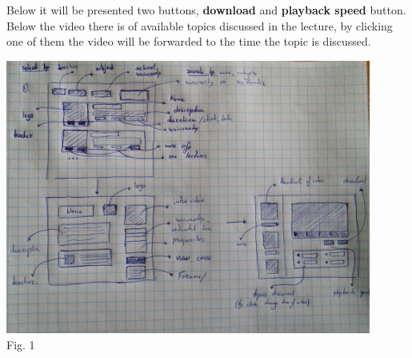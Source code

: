 \documentclass[12pt]{article}
\begin{document}
   Below it will be presented two buttons, \textbf{download} and \textbf{playback speed} button.
   Below the video there is of available topics discussed in the lecture, by clicking one of them the
   video will be forwarded to the time the topic is discussed.

   \vspace{0.5cm}

    \begin{minipage}[b]{1.0\linewidth}
      \begin{center}
        \includegraphics[width=0.9\textwidth]{img}
         \\ Fig. 1
      \end{center}
    \end{minipage}
\end{document}
